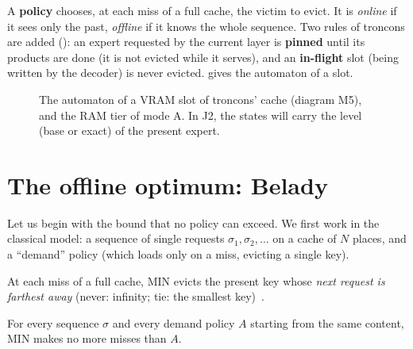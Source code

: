 A \textbf{policy} chooses, at each miss of a full cache, the victim to evict. It is \emph{online} if it sees only the past, \emph{offline} if it knows the whole sequence. Two rules of troncons are added (): an expert requested by the current layer is \textbf{pinned} until its products are done (it is not evicted while it serves), and an \textbf{in-flight} slot (being written by the decoder) is never evicted.  gives the automaton of a slot.

\begin{figure}[ht]
\centering
\SchemaCchAutomate
\caption[The automaton of an expert slot]{The automaton of a VRAM slot of troncons' cache (diagram M5), and the RAM tier of mode A. In J2, the states will carry the level (base or exact) of the present expert.}
\label{fig:t2o-automate}
\end{figure}

\section{The offline optimum: Belady}\label{sec:t2o-belady}

Let us begin with the bound that no policy can exceed. We first work in the classical model: a sequence of single requests $\sigma_1, \sigma_2, \ldots$ on a cache of $N$ places, and a \enquote{demand} policy (which loads only on a miss, evicting a single key).

\begin{definition}\label{def:t2o-min}
At each miss of a full cache, MIN evicts the present key whose \emph{next request is farthest away} (never: infinity; tie: the smallest key)~\cite{belady1966}.
\end{definition}

\begin{theoreme}\label{thm:t2o-belady}
For every sequence $\sigma$ and every demand policy $A$ starting from the same content, MIN makes no more misses than $A$.
\end{theoreme}

